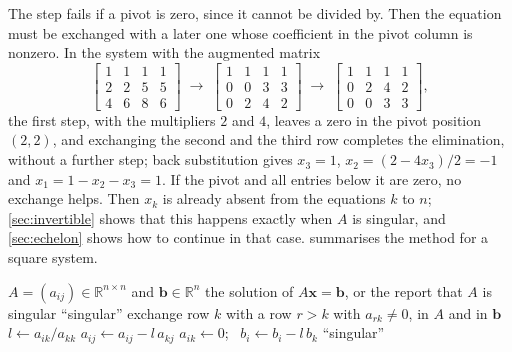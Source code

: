 The step fails if a pivot is zero, since it cannot be divided by. Then the equation must be exchanged with a later one whose coefficient in the pivot column is nonzero. In the system with the augmented matrix
\[
\left[\begin{array}{rrr|r}1&1&1&1\\2&2&5&5\\4&6&8&6\end{array}\right]
\;\longrightarrow\;
\left[\begin{array}{rrr|r}1&1&1&1\\0&0&3&3\\0&2&4&2\end{array}\right]
\;\longrightarrow\;
\left[\begin{array}{rrr|r}1&1&1&1\\0&2&4&2\\0&0&3&3\end{array}\right],
\]
the first step, with the multipliers $2$ and $4$, leaves a zero in the pivot position $(2,2)$, and exchanging the second and the third row completes the elimination, without a further step; back substitution gives $x_3=1$, $x_2=(2-4x_3)/2=-1$ and $x_1=1-x_2-x_3=1$. If the pivot and all entries below it are zero, no exchange helps. Then $x_k$ is already absent from the equations $k$ to $n$; \cref{sec:invertible} shows that this happens exactly when $A$ is singular, and \cref{sec:echelon} shows how to continue in that case.  summarises the method for a square system.

\begin{algorithm}
\begin{algorithmic}[1]
\Require $A=(a_{ij})\in\mathbb R^{n\times n}$ and $\mathbf b\in\mathbb R^n$
\Ensure the solution of $A\mathbf x=\mathbf b$, or the report that $A$ is singular
     \Return ``singular'' 
    \EndIf
    \State exchange row $k$ with a row $r>k$ with $a_{rk}\ne0$, in $A$ and in $\mathbf b$
  \EndIf
    \State $l\gets a_{ik}/a_{kk}$ 
      \State $a_{ij}\gets a_{ij}-l\,a_{kj}$
    \EndFor
    \State $a_{ik}\gets0$; \ $b_i\gets b_i-l\,b_k$
  \EndFor
\EndFor
{} \Return ``singular''
\EndIf
\State \Return {}
\end{algorithmic}
\caption{Gaussian elimination for a square system, followed by back substitution (\cref{alg:back-substitution}). A row exchange is made only when a pivot is zero; \cref{sec:pivoting} replaces this rule by a better one.}
\label{alg:gauss-solve}
\end{algorithm}

